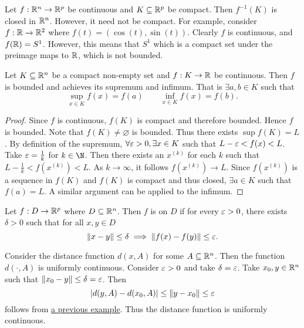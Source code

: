 \documentclass[../main.tex]{subfiles}
\begin{document}
\begin{remark}
    Let $f : \mathbb{R}^n \to \mathbb{R}^p$ be continuous and $K \subseteq \mathbb{R}^p$ be compact. Then $f^{-1}(K)$ is closed in $\mathbb{R}^n$. However, it need not be compact. For example, consider $f : \mathbb{R} \to \mathbb{R}^2$ where $f(t) = (\cos(t), \sin(t))$. Clearly $f$ is continuous, and $f(\mathbb{R}) = S^1$. However, this means that $S^1$ which is a compact set under the preimage maps to $\mathbb{R}$, which is not bounded.
\end{remark}

\begin{theorem}
    Let $K \subseteq \mathbb{R}^n$ be a compact non-empty set and $f : K \to \mathbb{R}$ be continuous. Then $f$ is bounded and achieves its supremum and infimum. That is $\exists a, b \in K$ such that
    \[
        \sup_{x \in K} f(x) = f(a) \quad\quad \inf_{x \in K} f(x) = f(b)
    .\]
\end{theorem}

\begin{proof}
    Since $f$ is continuous, $f(K)$ is compact and therefore bounded. Hence $f$ is bounded. Note that $f(K) \neq \varnothing$ is bounded. Thus there exists $\sup f(K) = L$. By definition of the supremum, $\forall \varepsilon > 0, \exists x \in K$ such that $L - \varepsilon < f(x) < L$. Take $\varepsilon = \frac{1}{k}$ for $k \in \N$. Then there exists an $x^{(k)}$ for each $k$ such that $L - \frac{1}{k} < f(x^{(k)}) < L$. As $k \to \infty$, it follows $f(x^{(k)}) \to L$. Since $f(x^{(k)})$ is a sequence in $f(K)$ and $f(K)$ is compact and thus closed, $\exists a \in K$ such that $f(a) = L$. A similar argument can be applied to the infimum.
\end{proof}

\begin{definition}
    Let $f : D \to \mathbb{R}^p$ where $D \subseteq \mathbb{R}^n$. Then $f$ is  on $D$ if for every $\varepsilon > 0$, there exists $\delta > 0$ such that for all $x,y \in D$
    \[
        \norm{x - y} \leq \delta \implies \norm{f(x) - f(y)} \leq \varepsilon
    .\]
\end{definition}

\begin{example}
    Consider the distance function $d(x,A)$ for some $A \subseteq \mathbb{R}^n$. Then the function $d(\cdot, A)$ is uniformly continuous. Consider $\varepsilon > 0$ and take $\delta = \varepsilon$. Take $x_0,y \in \mathbb{R}^n$ such that $\norm{x_0 - y} \leq \delta = \varepsilon$. Then
    \[
        |d(y, A) - d(x_0, A)| \leq \norm{y - x_0} \leq \varepsilon
    \]
    follows from \hyperref[ex:dist_continuous]{a previous example}. Thus the distance function is uniformly continuous.
\end{example}
\end{document}
